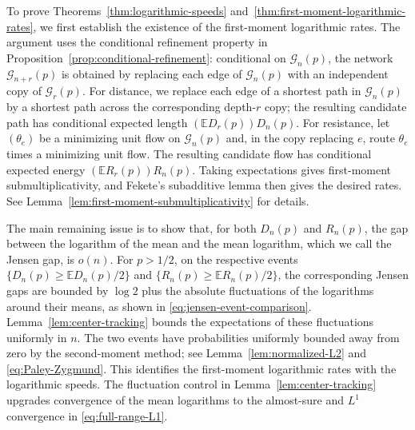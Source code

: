 \documentclass[12pt,preprint]{amsart}
\numberwithin{equation}{section}
\theoremstyle{plain}
\theoremstyle{definition}
\newcommand{\E}{\mathbb E}
\begin{document}
To prove Theorems~\ref{thm:logarithmic-speeds}
and~\ref{thm:first-moment-logarithmic-rates}, we first establish the
existence of the first-moment logarithmic rates.  The argument uses the conditional refinement property in
Proposition~\ref{prop:conditional-refinement}: conditional on
$\mathcal G_n(p)$, the network $\mathcal G_{n+r}(p)$ is obtained by replacing
each edge of $\mathcal G_n(p)$ with an independent copy of $\mathcal G_r(p)$.  For
distance, we replace each edge of a shortest path in $\mathcal G_n(p)$ by a
shortest path across the corresponding depth-$r$ copy; the resulting
candidate path has conditional expected length
$(\E D_r(p))D_n(p)$.  For resistance, let $(\theta_e)$ be a minimizing unit
flow on $\mathcal G_n(p)$ and, in the copy replacing $e$, route $\theta_e$
times a minimizing unit flow.  The resulting candidate flow has conditional
expected energy $(\E R_r(p))R_n(p)$.  Taking expectations gives first-moment
submultiplicativity, and Fekete's subadditive lemma then gives the desired rates.  See
Lemma~\ref{lem:first-moment-submultiplicativity} for details.

The main remaining issue is to show that, for both
$D_n(p)$ and $R_n(p)$, the gap between the logarithm of the mean and the mean
logarithm, which we call the Jensen gap, is $o(n)$. For $p>1/2$, on the respective events
$\{D_n(p)\ge\E D_n(p)/2\}$ and $\{R_n(p)\ge\E R_n(p)/2\}$, the corresponding
Jensen gaps are bounded by $\log2$ plus the absolute fluctuations of the
logarithms around their means, as shown in
\eqref{eq:jensen-event-comparison}.  Lemma~\ref{lem:center-tracking} bounds
the expectations of these fluctuations uniformly in $n$.  The two events
have probabilities uniformly bounded away from zero by the second-moment
method; see Lemma~\ref{lem:normalized-L2} and
\eqref{eq:Paley-Zygmund}.  This identifies the first-moment logarithmic rates
with the logarithmic speeds.
The fluctuation control in Lemma~\ref{lem:center-tracking} upgrades convergence of the mean logarithms
to the almost-sure and $L^1$ convergence in \eqref{eq:full-range-L1}.
\end{document}
